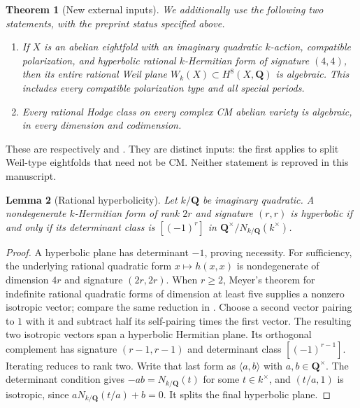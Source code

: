 \documentclass[11pt,reqno]{article}
\theoremstyle{emphasizedplain}
\theoremstyle{emphasizeddefinition}
\theoremstyle{emphasizeddefinition}
\newtheorem{prelemma}{Lemma}
\newtheorem{pretheorem}[prelemma]{Theorem}
\newcommand{\Q}{\mathbf Q}
\begin{document}
\begin{pretheorem}[New external inputs]\label{p:openai-inputs}
We additionally use the following two statements, with the preprint
status specified above.
\begin{enumerate}
\item If $X$ is an abelian eightfold with an imaginary quadratic
$k$-action, compatible polarization, and hyperbolic rational
$k$-Hermitian form of signature $(4,4)$, then its entire rational
Weil plane $W_k(X)\subset H^8(X,\Q)$ is algebraic. This includes
every compatible polarization type and all special periods.
\item Every rational Hodge class on every complex CM abelian variety
is algebraic, in every dimension and codimension.
\end{enumerate}
\end{pretheorem}
These are respectively \cite[Theorem 1.1]{OpenAIEightfold} and
\cite[Theorem 1.1]{OpenAICM}. They are distinct inputs: the first
applies to split Weil-type eightfolds that need not be CM. Neither
statement is reproved in this manuscript.

\begin{prelemma}[Rational hyperbolicity]\label{p:hyperbolic-test}
Let $k/\Q$ be imaginary quadratic. A nondegenerate $k$-Hermitian
form of rank $2r$ and signature $(r,r)$ is hyperbolic if and only if
its determinant class is $[(-1)^r]$ in
$\Q^\times/N_{k/\Q}(k^\times)$.
\end{prelemma}
\begin{proof}
A hyperbolic plane has determinant $-1$, proving necessity.
For sufficiency, the underlying rational quadratic form $x\mapsto h(x,x)$
is nondegenerate of dimension $4r$ and signature $(2r,2r)$.
When $r\geq2$, Meyer's theorem for indefinite rational quadratic
forms of dimension at least five supplies a nonzero isotropic vector;
compare the same reduction in \cite[Lemma 3.2]{OpenAIWeilPowers}.
Choose a second vector pairing to $1$ with it and subtract half its
self-pairing times the first vector. The resulting two isotropic
vectors span a hyperbolic Hermitian plane. Its orthogonal complement
has signature $(r-1,r-1)$ and determinant class $[(-1)^{r-1}]$.
Iterating reduces to rank two. Write that last form as
$\langle a,b\rangle$ with $a,b\in\Q^\times$.
The determinant condition gives $-ab=N_{k/\Q}(t)$ for some
$t\in k^\times$, and $(t/a,1)$ is isotropic, since
$aN_{k/\Q}(t/a)+b=0$. It splits the final hyperbolic plane.
\end{proof}
\end{document}
